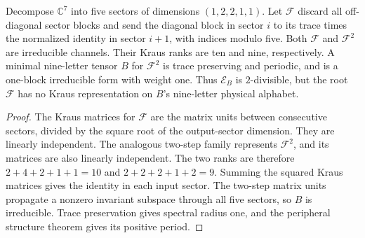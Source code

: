 \begin{lemma}
    \label{thm:periodic_supplied_root_rank_obstruction}
    \leanok
    Decompose $\mathbb C^7$ into five sectors of dimensions
    $(1,2,2,1,1)$. Let $\mathcal F$ discard all off-diagonal sector
    blocks and send the diagonal block in sector $i$ to its trace
    times the normalized identity in sector $i+1$, with indices modulo five.
    Both $\mathcal F$ and $\mathcal F^2$ are irreducible channels.
    Their Kraus ranks are ten and nine, respectively. A minimal nine-letter tensor
    $B$ for $\mathcal F^2$ is trace preserving and periodic, and is
    a one-block irreducible form with weight one. Thus $\mathcal E_B$
    is $2$-divisible, but the root $\mathcal F$ has no Kraus
    representation on $B$'s nine-letter physical alphabet.
\end{lemma}

\begin{proof}\leanok
    The Kraus matrices for $\mathcal F$ are the matrix units between
    consecutive sectors, divided by the square root of the output-sector
    dimension. They are linearly independent. The analogous two-step
    family represents $\mathcal F^2$, and its matrices are also linearly
    independent. The two ranks are therefore
    $2+4+2+1+1=10$ and $2+2+2+1+2=9$.
    Summing the squared Kraus matrices gives the identity in each input
    sector. The two-step matrix units propagate a nonzero invariant
    subspace through all five sectors, so $B$ is irreducible.
    Trace preservation gives spectral radius one, and the peripheral
    structure theorem gives its positive period.
\end{proof}


